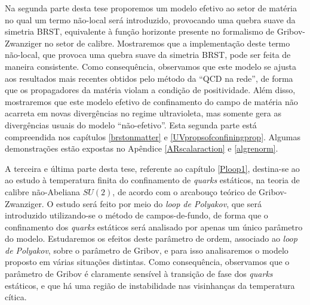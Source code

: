 Na segunda parte desta tese proporemos um modelo efetivo ao setor de mat\'eria no qual um termo
n\~ao-local ser\'a introduzido, provocando uma quebra suave da simetria BRST, equivalente \`a
fun\c{c}\~ao horizonte presente no formalismo de Gribov-Zwanziger no setor de calibre.
Mostraremos que a implementa\c{c}\~ao deste termo n\~ao-local, que provoca uma quebra suave da
simetria BRST, pode ser feita de maneira consistente. Como consequ\^encia, observamos que este
modelo se ajusta aos resultados mais recentes obtidos pelo m\'etodo da ``QCD na rede'', de
forma que os propagadores da mat\'eria violam a condi\c{c}\~ao de positividade. Al\'em disso,
mostraremos que este modelo efetivo de confinamento do campo de mat\'eria n\~ao acarreta em
novas diverg\^encias no regime ultravioleta, mas somente gera as diverg\^encias usuais do
modelo ``n\~ao-efetivo''. Esta segunda parte est\'a compreendida nos cap\'itulos
\ref{brstonmatter} e \ref{UVpropsofconfiningprop}. Algumas demonstra\c{c}\~oes est\~ao expostas
no Ap\^endice \ref{ARscalaraction} e \ref{algrenorm}.

A terceira e \'ultima parte desta tese, referente ao cap\'itulo \ref{Ploop1}, destina-se ao
ao estudo \`a temperatura finita do confinamento de \emph{quarks} est\'aticos, na teoria de calibre
n\~ao-Abeliana $SU(2)$, de acordo com o arcabou\c{c}o te\'orico de Gribov-Zwanziger. O estudo
ser\'a feito por meio do \emph{loop de Polyakov}, que ser\'a introduzido utilizando-se o
m\'etodo de campos-de-fundo, de forma que o confinamento dos \emph{quarks} est\'aticos ser\'a
analisado por apenas um \'unico par\^ametro do modelo. Estudaremos os efeitos deste
par\^ametro de ordem, associado ao \emph{loop de Polyakov}, sobre o par\^ametro de Gribov, e
para isso analisaremos o modelo proposto em v\'arias situa\c{c}\~oes distintas. Como
consequ\^encia, observamos que o par\^ametro de Gribov \'e claramente sens\'ivel \`a
transi\c{c}\~ao de fase dos \emph{quarks} est\'aticos, e que h\'a uma regi\~ao de instabilidade
nas visinhan\c{c}as da temperatura c\'itica. 
